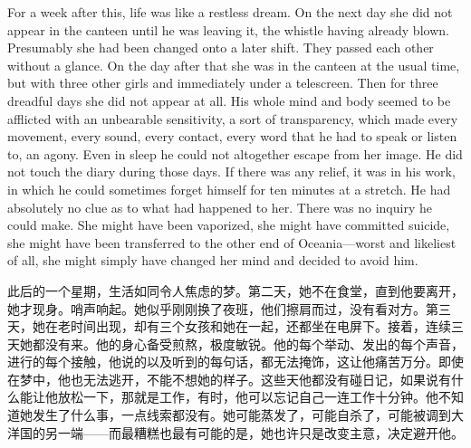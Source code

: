 \begin{paracol}{2}
For a week after this, life was like a restless dream. On the next day
she did not appear in the canteen until he was leaving it, the whistle
having already blown. Presumably she had been changed onto a later
shift. They passed each other without a glance. On the day after that
she was in the canteen at the usual time, but with three other girls and
immediately under a telescreen. Then for three dreadful days she did not
appear at all. His whole mind and body seemed to be afflicted with an
unbearable sensitivity, a sort of transparency, which made every
movement, every sound, every contact, every word that he had to speak or
listen to, an agony. Even in sleep he could not altogether escape from
her image. He did not touch the diary during those days. If there was
any relief, it was in his work, in which he could sometimes forget
himself for ten minutes at a stretch. He had absolutely no clue as to
what had happened to her. There was no inquiry he could make. She might
have been vaporized, she might have committed suicide, she might have
been transferred to the other end of Oceania---worst and likeliest of
all, she might simply have changed her mind and decided to avoid him.

\switchcolumn

此后的一个星期，生活如同令人焦虑的梦。第二天，她不在食堂，直到他要离开，她才现身。哨声响起。她似乎刚刚换了夜班，他们擦肩而过，没有看对方。第三天，她在老时间出现，却有三个女孩和她在一起，还都坐在电屏下。接着，连续三天她都没有来。他的身心备受煎熬，极度敏锐。他的每个举动、发出的每个声音，进行的每个接触，他说的以及听到的每句话，都无法掩饰，这让他痛苦万分。即使在梦中，他也无法逃开，不能不想她的样子。这些天他都没有碰日记，如果说有什么能让他放松一下，那就是工作，有时，他可以忘记自己一连工作十分钟。他不知道她发生了什么事，一点线索都没有。她可能蒸发了，可能自杀了，可能被调到大洋国的另一端——而最糟糕也最有可能的是，她也许只是改变主意，决定避开他。

\switchcolumn*


\end{paracol}
